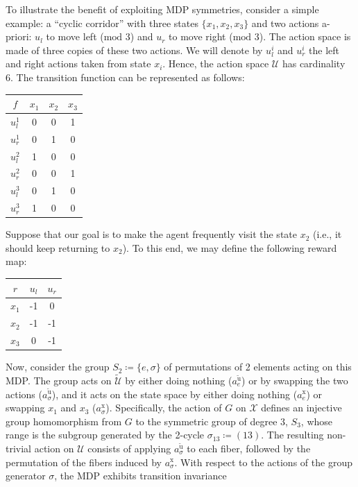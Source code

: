 \documentclass[10pt,leqno]{amsart}
\newcommand{\repr}[1]{a^{#1}}
\newcommand{\reprarg}[2]{\repr{#1}_{#2}}
\newcommand{\U}{\mathcal{U}}
\newcommand{\X}{\mathcal{X}}
\newcommand{\cost}{r}
\begin{document}
To illustrate the benefit of exploiting MDP symmetries, consider a simple example: a ``cyclic corridor'' with three states $\{x_1, x_2, x_3\}$ and two actions a-priori: $u_l$ to move left ($\text{mod } 3$) and $u_r$ to move right ($\text{mod } 3$). The action space is made of three copies of these two actions. We will denote by $u_l^i$ and $u_r^i$ the left and right actions taken from state $x_i$. Hence, the action space $\U$ has cardinality 6. The transition function can be represented as follows:
\begin{center}
    \begin{tabular}[]{c|ccc}
        $f$ & $x_1$ & $x_2$ & $x_3$\\
        \hline
        $u_l^1$ & 0 & 0 & 1\\
        $u_r^1$ & 0 & 1 & 0\\
        $u_l^2$ & 1 & 0 & 0\\
        $u_r^2$ & 0 & 0 & 1\\
        $u_l^3$ & 0 & 1 & 0\\
        $u_r^3$ & 1 & 0 & 0\\
    \end{tabular}
\end{center}
Suppose that our goal is to make the agent frequently visit the state $x_2$ (i.e., it should keep returning to $x_2$). To this end, we may define the following reward map:
\begin{center}
    \begin{tabular}[]{c|cc}
        $\cost$ & $u_l$ & $u_r$\\
        \hline
        $x_1$ & -1 & 0\\
        $x_2$ & -1 & -1\\
        $x_3$ & 0 & -1\\
    \end{tabular}
\end{center}
Now, consider the group $S_2 \coloneqq \{e, \sigma\}$ of permutations of 2 elements acting on this MDP. The group acts on $\tilde{\U}$ by either doing nothing ($\reprarg{\tilde{\mathrm{u}}}{e}$) or by swapping the two actions ($\reprarg{\tilde{\mathrm{u}}}{\sigma}$), and it acts on the state space by either doing nothing ($\reprarg{\mathrm{x}}{e}$) or swapping $x_1$ and $x_3$ ($\reprarg{\mathrm{x}}{\sigma}$). Specifically, the action of $G$ on $\X$ defines an injective group homomorphism from $G$ to the symmetric group of degree 3, $S_3$, whose range is the subgroup generated by the 2-cycle $\sigma_{13} \coloneqq (13)$. The resulting non-trivial action on $\U$ consists of applying $\reprarg{\tilde{\mathrm{u}}}{\sigma}$ to each fiber, followed by the permutation of the fibers induced by $\reprarg{\mathrm{x}}{\sigma}$. With respect to the actions of the group generator $\sigma$, the MDP exhibits transition invariance
\end{document}
